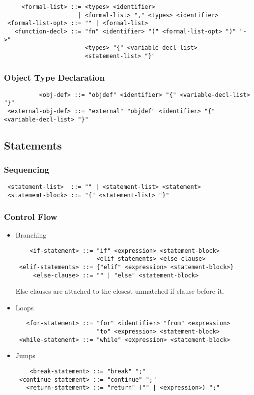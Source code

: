 \begin{verbatim}
     <formal-list> ::= <types> <identifier>
                     | <formal-list> "," <types> <identifier>
 <formal-list-opt> ::= "" | <formal-list>
   <function-decl> ::= "fn" <identifier> "(" <formal-list-opt> ")" "->"
                       <types> "{" <variable-decl-list>
                       <statement-list> "}"
\end{verbatim}

\subsubsection{Object Type Declaration}

\begin{verbatim}
          <obj-def> ::= "objdef" <identifier> "{" <variable-decl-list> "}"
 <external-obj-def> ::= "external" "objdef" <identifier> "{" <variable-decl-list> "}"
\end{verbatim}

\subsection{Statements}

\subsubsection{Sequencing}

\begin{verbatim}
 <statement-list>  ::= "" | <statement-list> <statement>
 <statememt-block> ::= "{" <statement-list> "}"
\end{verbatim}

\subsubsection{Control Flow}

\begin{itemize}
\item Branching
\begin{verbatim}
    <if-statement> ::= "if" <expression> <statement-block>
                       <elif-statements> <else-clause>
 <elif-statements> ::= {"elif" <expression> <statement-block>}
     <else-clause> ::= "" | "else" <statement-block>
\end{verbatim}
Else clauses are attached to the closest unmatched if clause before it.

\item Loops
\begin{verbatim}
   <for-statement> ::= "for" <identifier> "from" <expression>
                       "to" <expression> <statement-block>
 <while-statement> ::= "while" <expression> <statement-block>
\end{verbatim}

\item Jumps
\begin{verbatim}
    <break-statement> ::= "break" ";"
 <continue-statement> ::= "continue" ";"
   <return-statement> ::= "return" ("" | <expression>) ";"
\end{verbatim}
\end{itemize}

